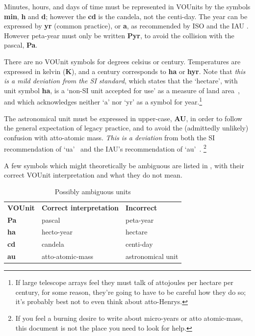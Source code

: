 \documentclass[11pt,notitlepage,onecolumn]{ivoa}
\newcommand{\unit}[1]{\textbf{\textsf{\color{orange}#1}}}
\begin{document}
Minutes, hours, and days of time must be represented in VOUnits by the
symbols \unit{min}, \unit{h} and \unit{d}; however the \unit{cd} is
the candela, not the centi-day.  The year can be expressed by
\unit{yr} (common practice),
or \unit{a},
as recommended by ISO \citep[Annex C]{std:iso80000-3}
and the IAU \citep[Table 6]{wilkins89}.
However peta-year must only be written \unit{Pyr},
to avoid the collision with the pascal, \unit{Pa}.

There are no VOUnit symbols for degrees celsius or century.
Temperatures are expressed in kelvin (\unit{K}),
and a century corresponds to \unit{ha} or \unit{hyr}.
Note that \emph{this is a mild deviation from the SI standard},
which states that the `hectare', with unit symbol \unit{ha},
is a `non-SI unit accepted for use' as a measure of land area~\citep[table~6]{si-brochure},
and which acknowledges neither `a' nor `yr' as a symbol for year.\footnote{If
large telescope arrays feel they must talk of attojoules per
hectare per century, for some reason, they're going to have to be
careful how they do so; it's probably best not to even think about atto-Henrys.}

The astronomical unit must be expressed in upper-case, \unit{AU},
in order to follow the general expectation of legacy practice,
and to avoid the (admittedly unlikely) confusion with atto-atomic mass.
\emph{This is a deviation} from both the SI recommendation of
`ua'~\citep[Table 7]{si-brochure} and the IAU's recommendation of `au'~\citep{iau12}.%
\footnote{If you feel a burning desire to write about micro-years or
atto atomic-mass, this document is not the place you need to look
for help.}

A few symbols which might theoretically be ambiguous are listed in ,
with their correct VOUnit interpretation and what they do not mean.


\begin{table}[bht]
\begin{center}
\begin{tabular}{lll}
\textbf{VOUnit}&\textbf{Correct interpretation}&\textbf{Incorrect}\\
\unit{Pa}&pascal&peta-year\\
\unit{ha}&hecto-year&hectare\\
\unit{cd}&candela&centi-day\\
\unit{au}&atto-atomic-mass&astronomical unit\\
\end{tabular}
\end{center}
\caption{\label{tab:ambiguous}Possibly ambiguous units}
\end{table}
\end{document}
